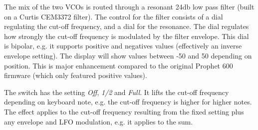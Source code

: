 The mix of the two VCOs is routed through a resonant 24db low pass filter (built on a Curtis CEM3372 filter). The control for the filter consists of a \filtercutoff dial regulating the cut-off frequency, and a \filterres dial for the resonance. The \filterenv dial regulates how strongly the cut-off frequency is modulated by the filter envelope. This dial is bipolar, e.g. it supports positive and negatives values (effectively an inverse envelope setting). The display will show values between -50 and 50 depending on position. This is major enhancement compared to the original Prophet 600 firmware (which only featured positive values).

\begin{center}
\end{center}

The \keyboardtrack switch has the setting \textit{Off}, \textit{1/2} and \textit{Full}. It lifts the cut-off frequency depending on keyboard note, e.g. the cut-off frequency is higher for higher notes. The effect applies to the cut-off frequency resulting from the fixed \filtercutoff setting plus any envelope and LFO modulation, e.g. it applies to the sum.  
